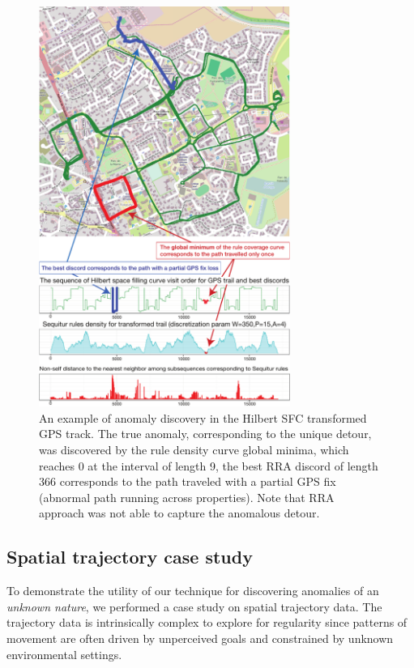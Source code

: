 \documentclass{sig-alternate}
\begin{document}
\begin{figure}[t]
   \centering
   \includegraphics[width=82mm]{path_figure-option-new.pdf}
   \caption{An example of anomaly discovery in the Hilbert SFC transformed GPS track. The true anomaly, corresponding to the unique detour, was discovered by the rule density curve global minima, which reaches 0 at the interval of length 9, the best RRA discord of length 366 corresponds to the path traveled with a partial GPS fix (abnormal path running across properties). Note that RRA approach was not able to capture the anomalous detour.}   
   \label{fig:gps}
\end{figure}

\subsection{Spatial trajectory case study}
To demonstrate the utility of our technique for discovering anomalies of an \textit{unknown nature}, we performed a case study on spatial trajectory data. The trajectory data is intrinsically complex to explore for regularity since patterns of movement are often driven by unperceived goals and constrained by unknown environmental settings. 
\end{document}

